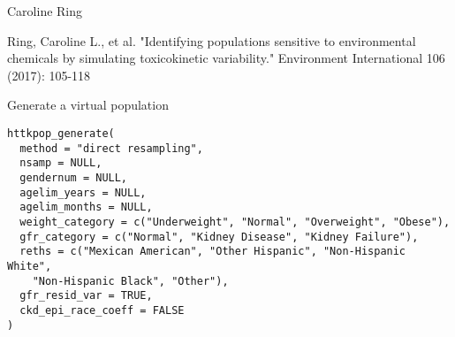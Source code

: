 \documentclass[a4paper]{book}
\begin{document}
%
\begin{Author}\relax
Caroline Ring
\end{Author}
%
\begin{References}\relax
Ring, Caroline L., et al. "Identifying populations sensitive to 
environmental chemicals by simulating toxicokinetic variability." Environment 
International 106 (2017): 105-118
\end{References}
%
\begin{Description}\relax
Generate a virtual population
\end{Description}
%
\begin{Usage}
\begin{verbatim}
httkpop_generate(
  method = "direct resampling",
  nsamp = NULL,
  gendernum = NULL,
  agelim_years = NULL,
  agelim_months = NULL,
  weight_category = c("Underweight", "Normal", "Overweight", "Obese"),
  gfr_category = c("Normal", "Kidney Disease", "Kidney Failure"),
  reths = c("Mexican American", "Other Hispanic", "Non-Hispanic White",
    "Non-Hispanic Black", "Other"),
  gfr_resid_var = TRUE,
  ckd_epi_race_coeff = FALSE
)
\end{verbatim}
\end{Usage}
%
\end{document}
